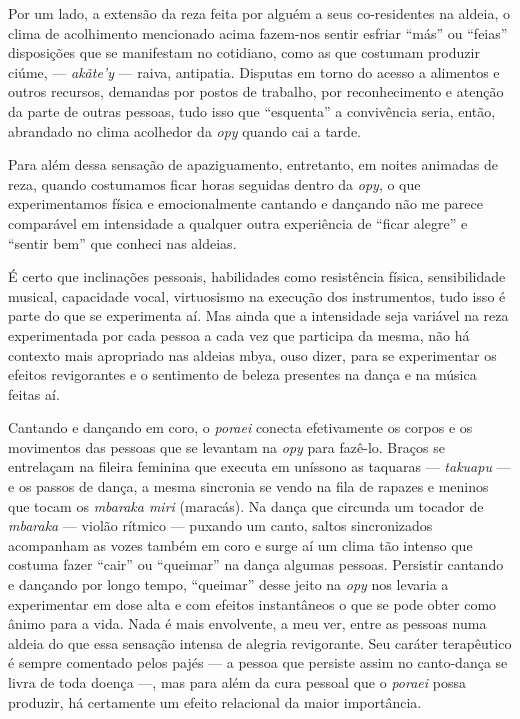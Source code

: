 Por um lado, a extensão da reza feita por alguém a seus co-residentes na
aldeia, o clima de acolhimento mencionado acima fazem-nos sentir
esfriar ``más'' ou ``feias'' disposições que se manifestam no cotidiano,
como as que costumam produzir ciúme, --- \emph{akãte’y} --- raiva, antipatia.
Disputas em torno do acesso a alimentos e outros recursos, demandas por
postos de trabalho, por reconhecimento e atenção da parte de outras
pessoas, tudo isso que ``esquenta'' a convivência seria, então, abrandado
no clima acolhedor da \emph{opy} quando cai a tarde.

Para além dessa sensação de apaziguamento, entretanto, em noites
animadas de reza, quando costumamos ficar horas seguidas dentro da \emph{opy},
o que experimentamos física e emocionalmente cantando e dançando não me
parece comparável em intensidade a qualquer outra experiência de ``ficar
alegre'' e ``sentir bem'' que conheci nas aldeias.

É certo que inclinações pessoais, habilidades como resistência física,
sensibilidade musical, capacidade vocal, virtuosismo na execução dos
instrumentos, tudo isso é parte do que se experimenta aí. Mas ainda que
a intensidade seja variável na reza experimentada por cada pessoa a
cada vez que participa da mesma, não há contexto mais apropriado nas
aldeias mbya, ouso dizer, para se experimentar os efeitos revigorantes
e o sentimento de beleza presentes na dança e na música feitas aí.

Cantando e dançando em coro, o \emph{poraei} conecta efetivamente os corpos e
os movimentos das pessoas que se levantam na \emph{opy} para fazê-lo. Braços
se entrelaçam na fileira feminina que executa em uníssono as taquaras ---
\emph{takuapu} --- e os passos de dança, a mesma sincronia se vendo na fila de
rapazes e meninos que tocam os \emph{mbaraka miri} (maracás). Na dança que
circunda um tocador de \emph{mbaraka} --- violão rítmico --- puxando um canto,
saltos sincronizados acompanham as vozes também em coro e surge aí um
clima tão intenso que costuma fazer ``cair'' ou ``queimar'' na dança
algumas pessoas. Persistir cantando e dançando por longo tempo,
``queimar'' desse jeito na \emph{opy} nos levaria a experimentar em dose alta e
com efeitos instantâneos o que se pode obter como ânimo para a vida.
Nada é mais envolvente, a meu ver, entre as pessoas numa aldeia do que
essa sensação intensa de alegria revigorante. Seu caráter terapêutico é
sempre comentado pelos pajés --- a pessoa que persiste assim no canto-dança
se livra de toda doença ---, mas para além da cura pessoal que o
\emph{poraei} possa produzir, há certamente um efeito relacional da maior
importância.

